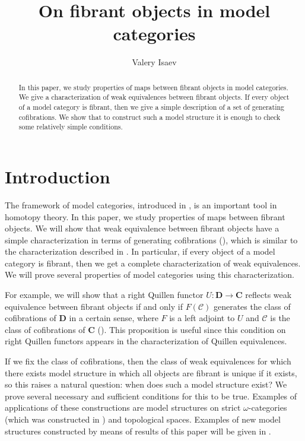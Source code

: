 \documentclass{tac}
\author{Valery Isaev}
\title{On fibrant objects in model categories}
\theoremstyle{definition}
\newcommand{\cof}{\mathcal{C}}
\newcommand{\cat}[1]{\mathbf{#1}}
\newcommand{\C}{\cat{C}}
\newcommand{\D}{\cat{D}}
\begin{document}
\maketitle

\begin{abstract}
In this paper, we study properties of maps between fibrant objects in model categories.
We give a characterization of weak equivalences between fibrant objects.
If every object of a model category is fibrant, then we give a simple description of a set of generating cofibrations.
We show that to construct such a model structure it is enough to check some relatively simple conditions.
\end{abstract}

\section{Introduction}

The framework of model categories, introduced in \cite{quillen}, is an important tool in homotopy theory.
In this paper, we study properties of maps between fibrant objects.
We will show that weak equivalence between fibrant objects have a simple characterization in terms of generating cofibrations (),
which is similar to the characterization described in \cite{vogt-we}.
In particular, if every object of a model category is fibrant, then we get a complete characterization of weak equivalences.
We will prove several properties of model categories using this characterization.

For example, we will show that a right Quillen functor $U : \D \to \C$ reflects weak equivalence between fibrant objects if and only if
$F(\cof)$ generates the class of cofibrations of $\D$ in a certain sense, where $F$ is a left adjoint to $U$ and $\cof$ is the class of cofibrations of $\C$ ().
This proposition is useful since this condition on right Quillen functors appears in the characterization of Quillen equivalences. 

If we fix the class of cofibrations, then the class of weak equivalences for which there exists model structure in which all objects are fibrant is unique if it exists,
so this raises a natural question: when does such a model structure exist?
We prove several necessary and sufficient conditions for this to be true.
Examples of applications of these constructions are model structures on strict $\omega$-categories (which was constructed in \cite{folk}) and topological spaces.
Examples of new model structures constructed by means of results of this paper will be given in \cite{alg-models}.
\end{document}
